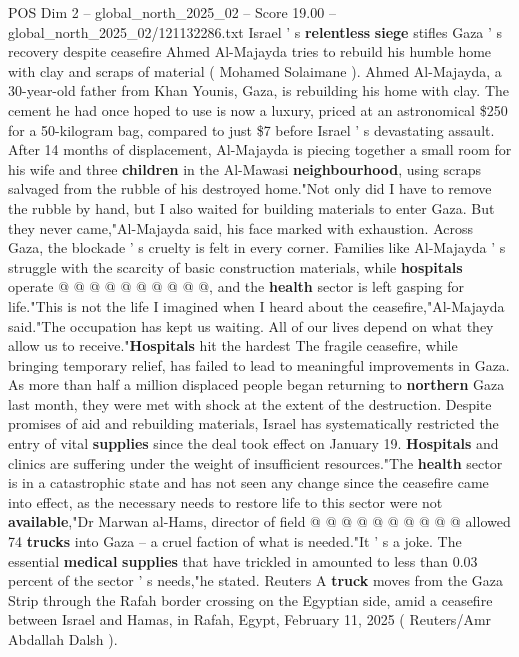 \begin{textsample}{POS Dim 2 – global\_north\_2025\_02 – Score 19.00 – global\_north\_2025\_02/121132286.txt}  \label{ex:f2_pos_439}
Israel ' s \textbf{relentless} \textbf{siege} stifles Gaza ' s recovery despite ceasefire Ahmed Al-Majayda tries to rebuild his humble home with clay and scraps of material ( Mohamed Solaimane ).
Ahmed Al-Majayda, a 30-year-old father from Khan Younis, Gaza, is rebuilding his home with clay.
The cement he had once hoped to use is now a luxury, priced at an astronomical \$250 for a 50-kilogram bag, compared to just \$7 before Israel ' s devastating assault.
After 14 months of displacement, Al-Majayda is piecing together a small room for his wife and three \textbf{children} in the Al-Mawasi \textbf{neighbourhood}, using scraps salvaged from the rubble of his destroyed home."Not only did I have to remove the rubble by hand, but I also waited for building materials to enter Gaza.
But they never came,"Al-Majayda said, his face marked with exhaustion.
Across Gaza, the blockade ' s cruelty is felt in every corner.
Families like Al-Majayda ' s struggle with the scarcity of basic construction materials, while \textbf{hospitals} operate @ @ @ @ @ @ @ @ @ @, and the \textbf{health} sector is left gasping for life."This is not the life I imagined when I heard about the ceasefire,"Al-Majayda said."The occupation has kept us waiting.
All of our lives depend on what they allow us to receive."\textbf{Hospitals} hit the hardest The fragile ceasefire, while bringing temporary relief, has failed to lead to meaningful improvements in Gaza.
As more than half a million displaced people began returning to \textbf{northern} Gaza last month, they were met with shock at the extent of the destruction.
Despite promises of aid and rebuilding materials, Israel has systematically restricted the entry of vital \textbf{supplies} since the deal took effect on January 19. \textbf{Hospitals} and clinics are suffering under the weight of insufficient resources."The \textbf{health} sector is in a catastrophic state and has not seen any change since the ceasefire came into effect, as the necessary needs to restore life to this sector were not \textbf{available},"Dr Marwan al-Hams, director of field @ @ @ @ @ @ @ @ @ @ allowed 74 \textbf{trucks} into Gaza -- a cruel faction of what is needed."It ' s a joke.
The essential \textbf{medical} \textbf{supplies} that have trickled in amounted to less than 0.03 percent of the sector ' s needs,"he stated.
Reuters A \textbf{truck} moves from the Gaza Strip through the Rafah border crossing on the Egyptian side, amid a ceasefire between Israel and Hamas, in Rafah, Egypt, February 11, 2025 ( Reuters/Amr Abdallah Dalsh ).

\end{textsample}
